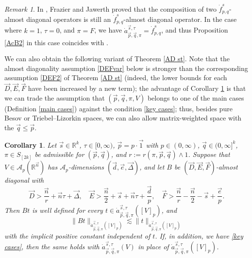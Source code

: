 \documentclass[11pt, reqno]{amsart}
\newtheorem{corollary}[theorem]{Corollary}
\theoremstyle{definition}
\theoremstyle{remark}
\newtheorem{remark}[theorem]{Remark}
\numberwithin{equation}{section}
\newcommand{\A}{\mathscr A}
\newcommand{\vD}{\vec D}
\newcommand{\vE}{\vec E}
\newcommand{\vF}{\vec F}
\newcommand{\R}{\mathbb R}
\newcommand{\vone}{\vec 1}
\newcommand{\vd}{\vec d}
\newcommand{\vDe}{\vec{\Delta}}
\newcommand{\ve}{\vec e}
\newcommand{\vn}{\vec n}
\newcommand{\vp}{\vec p}
\newcommand{\vq}{\vec q}
\newcommand{\vs}{\vec s}
\newcommand{\atau}{\dot a^{\vs,\tau}_{\vp,\vq,\pi}}
\newcommand{\Norm}[2]{\|#1\|_{#2}}
\begin{document}
\begin{remark}
In \cite[Theorem 9.1(i)]{FJ90}, Frazier and Jawerth proved that
the composition of two $\dot f^s_{p,q}$-almost diagonal operators
is still an $\dot f^s_{p,q}$-almost diagonal operator.
In the case where $k=1$, $\tau=0$, and $\pi=F$, we have
$\dot a^{\vec s,\tau}_{\vec p,\vec q,\pi}=\dot f^s_{p,q}$,
and thus Proposition \ref{AcB2} in this case coincides with \cite[Thoerem 9.1(i)]{FJ90}.
\end{remark}


We can also obtain the following variant of Theorem \ref{AD st}. Note that the almost diagonality assumption \eqref{DEFvar} below is stronger than the corresponding assumption \eqref{DEF2} of Theorem \ref{AD st} (indeed, the lower bounds for each $\vD,\vE,\vF$ have been increased by a new term); the advantage of Corollary \ref{AD variant} is that we can trade the assumption that $(\vp,\vq,\pi,V)$ belongs to one of the main cases (Definition \ref{main cases}) against the condition \eqref{key cases}; thus, besides pure Besov or Triebel--Lizorkin spaces, we can also allow matrix-weighted space with the $\vq\leq\vp$.


\begin{corollary} \label{AD variant}
Let $\vs\in\R^k$, $\tau\in[0,\infty)$, $\vp=p\cdot\vone$ with $p\in(0,\infty)$,
$\vq\in(0,\infty]^k$, $\pi\in S_{[2k]}$ be admissible for $(\vp,\vq)$,
and $r:=r(\pi,\vp,\vq)\wedge 1$.
Suppose that $V\in\A_p(\R^{\vn})$ has $\A_p$-dimensions $(\vd,\ve,\vDe)$,
and let $B$ be $(\vD,\vE,\vF)$-almost diagonal with
\begin{equation}\label{DEFvar}
\vD>\frac{\vn}{r}+\vn\tau + \vec\Delta,\quad
\vE>\frac{\vn}{2}+\vs+\vn\tau + \frac{\vec d}{p},\quad
\vF>\frac{\vn}{r}-\frac{\vn}{2}-\vs + \frac{\vec e}{p}.
\end{equation}
Then $Bt$ is well defined for every $t\in\atau([V]_p)$, and
\begin{equation*}
\Norm{Bt}{\atau([V]_p)}
\lesssim\Norm{t}{\atau([V]_p)}
\end{equation*}
with the implicit positive constant independent of $t$. If, in addition, we have \eqref{key cases}, then the same holds with $\atau(V)$ in place of $\atau([V]_p)$.
\end{corollary}
\end{document}
